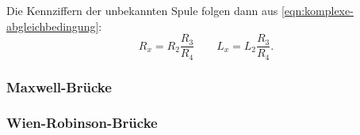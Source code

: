 Die Kennziffern der unbekannten Spule folgen dann aus \autoref{eqn:komplexe-abgleichbedingung}:
\begin{equation}
	R_x = R_2 \frac{R_3}{R_4}
	\qquad
	L_x = L_2 \frac{R_3}{R_4}.
	\label{eqn:values-induktivitaetsbruecke}
\end{equation}


\subsubsection{Maxwell-Brücke}
\label{sec:theorie-maxwell-bruecke}

\subsubsection{Wien-Robinson-Brücke}
\label{sec:theorie-wien-robinson-bruecke}


\cite{sample}
